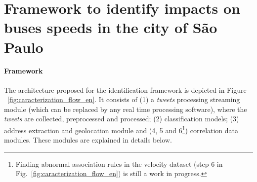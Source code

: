 \documentclass[runningheads]{llncs}
\begin{document}

\section{Framework to identify impacts on buses speeds in the city of São Paulo}

\paragraph{\textbf{Framework}}

The architecture proposed for the identification framework is depicted in Figure ~\ref{fig:caracterization_flow_en}. It consists of (1) a \textit{tweets} processing streaming module (which can be replaced by any real time processing software), where the \textit{tweets} are collected, preprocessed and processed; (2) classification models; (3) address extraction and geolocation module and (4, 5 and 6\footnote{Finding abnormal association rules in the velocity dataset (step 6 in Fig.~\ref{fig:caracterization_flow_en}) is still a work in progress.}) correlation data modules. These modules are explained in details below.
\end{document}
